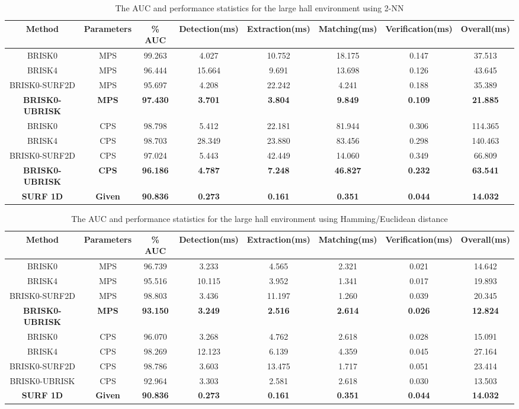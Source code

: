 \documentclass{report}
\begin{document}
\begin{table}

\tiny
\caption{The AUC and performance statistics for the large hall environment
using 2-NN}


\begin{tabular}{|c|c|c|c|c|c|c|c|}
\hline 
\textbf{Method} & \textbf{Parameters} & \textbf{\% AUC} & \textbf{Detection(ms)} & \textbf{Extraction(ms)} & \textbf{Matching(ms)} & \textbf{Verification(ms)} & \textbf{Overall(ms)}\tabularnewline
\hline 
\hline 
BRISK0 & MPS & 99.263 & 4.027 & 10.752 & 18.175 & 0.147 & 37.513\tabularnewline
\hline 
BRISK4 & MPS & 96.444 & 15.664 & 9.691 & 13.698 & 0.126 & 43.645\tabularnewline
\hline 
BRISK0-SURF2D & MPS & 95.697 & 4.208 & 22.242 & 4.241 & 0.188 & 35.389\tabularnewline
\hline 
\textbf{BRISK0-UBRISK} & \textbf{MPS} & \textbf{97.430} & \textbf{3.701} & \textbf{3.804} & \textbf{9.849} & \textbf{0.109} & \textbf{21.885}\tabularnewline
\hline 
BRISK0 & CPS & 98.798 & 5.412 & 22.181 & 81.944 & 0.306 & 114.365\tabularnewline
\hline 
BRISK4 & CPS & 98.703 & 28.349 & 23.880 & 83.456 & 0.298 & 140.463\tabularnewline
\hline 
BRISK0-SURF2D & CPS & 97.024 & 5.443 & 42.449 & 14.060 & 0.349 & 66.809\tabularnewline
\hline 
\textbf{BRISK0-UBRISK} & \textbf{CPS} & \textbf{96.186} & \textbf{4.787} & \textbf{7.248} & \textbf{46.827} & \textbf{0.232} & \textbf{63.541}\tabularnewline
\hline 
\textbf{SURF 1D} & \textbf{Given} & \textbf{90.836} & \textbf{0.273} & \textbf{0.161} & \textbf{0.351} & \textbf{0.044} & \textbf{14.032}\tabularnewline
\hline 
\end{tabular}
\label{tab:hallStatsKnn}
\end{table}


\begin{table}
\caption{The AUC and performance statistics for the large hall environment
using Hamming/Euclidean distance}
\tiny
\begin{tabular}{|c|c|c|c|c|c|c|c|}
\hline 
\textbf{Method} & \textbf{Parameters} & \textbf{\% AUC} & \textbf{Detection(ms)} & \textbf{Extraction(ms)} & \textbf{Matching(ms)} & \textbf{Verification(ms)} & \textbf{Overall(ms)}\tabularnewline
\hline 
\hline 
BRISK0 & MPS & 96.739 & 3.233 & 4.565 & 2.321 & 0.021 & 14.642\tabularnewline
\hline 
BRISK4 & MPS & 95.516 & 10.115 & 3.952 & 1.341 & 0.017 & 19.893\tabularnewline
\hline 
BRISK0-SURF2D & MPS & 98.803 & 3.436 & 11.197 & 1.260 & 0.039 & 20.345\tabularnewline
\hline 
\textbf{BRISK0-UBRISK} & \textbf{MPS} & \textbf{93.150} & \textbf{3.249} & \textbf{2.516} & \textbf{2.614} & \textbf{0.026} & \textbf{12.824}\tabularnewline
\hline 
BRISK0 & CPS & 96.070 & 3.268 & 4.762 & 2.618 & 0.028 & 15.091\tabularnewline
\hline 
BRISK4 & CPS & 98.269 & 12.123 & 6.139 & 4.359 & 0.045 & 27.164\tabularnewline
\hline 
BRISK0-SURF2D & CPS & 98.786 & 3.603 & 13.475 & 1.717 & 0.051 & 23.414\tabularnewline
\hline 
BRISK0-UBRISK & CPS & 92.964 & 3.303 & 2.581 & 2.618 & 0.030 & 13.503\tabularnewline
\hline 
\textbf{SURF 1D} & \textbf{Given} & \textbf{90.836} & \textbf{0.273} & \textbf{0.161} & \textbf{0.351} & \textbf{0.044} & \textbf{14.032}\tabularnewline
\hline 
\end{tabular}
\label{tab:hallStatsHamming}
\end{table}
\end{document}
